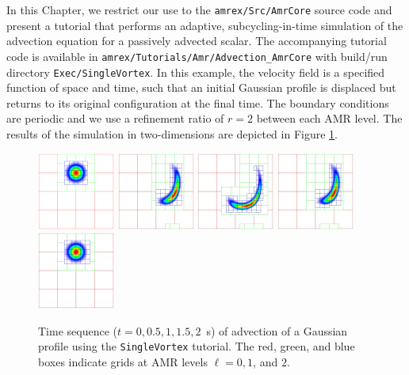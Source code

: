 In this Chapter, we restrict our use to the {\tt amrex/Src/AmrCore} source code
and present a tutorial that performs an adaptive, subcycling-in-time simulation
of the advection equation for a passively advected scalar.
The accompanying tutorial code is available in {\tt amrex/Tutorials/Amr/Advection\_AmrCore}
with build/run directory {\tt Exec/SingleVortex}.  In this example, the velocity
field is a specified function of space and time, such that an initial
Gaussian profile is displaced but returns to its original configuration at the final time.
The boundary conditions are periodic and we use a refinement ratio of $r=2$ between each 
AMR level.  The results of the simulation in two-dimensions are depicted in 
Figure \ref{fig:Adv}.
\begin{figure}
  \centering
  \includegraphics[width=1in]{./AmrCore/figs/Adv1.pdf}
  \includegraphics[width=1in]{./AmrCore/figs/Adv2.pdf}
  \includegraphics[width=1in]{./AmrCore/figs/Adv3.pdf}
  \includegraphics[width=1in]{./AmrCore/figs/Adv4.pdf}
  \includegraphics[width=1in]{./AmrCore/figs/Adv5.pdf}
  \caption{\label{fig:Adv} Time sequence ($t=0,0.5,1,1.5,2$~s) of advection of a Gaussian profile using the 
{\tt SingleVortex} tutorial.  The red, green, and blue boxes indicate grids at AMR levels $\ell=0,1$, and $2$.}
\end{figure}

